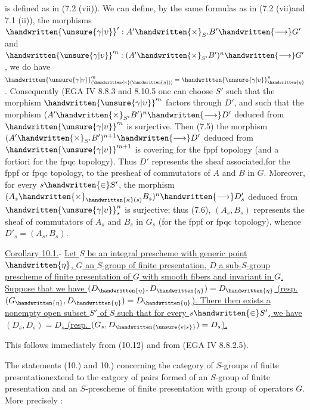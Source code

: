 is defined as in (7.2 (vii)). We can define, by the same formulas as in (7.2 (vii)and 7.1 (ii)), the morphisms $\handwritten{\unsure{\gamma|\upsilon}}':A'\handwritten{\times}_{S'}B'\handwritten{\longrightarrow}G'$ and $\handwritten{\unsure{\gamma|\upsilon}}'^n:(A'\handwritten{\times}_{S'}B')^n\handwritten{\longrightarrow}G'$, we do have $\handwritten{\unsure{\gamma|\upsilon}}'^n_{(\handwritten{\kappa}(\handwritten{\eta}))}=\handwritten{\unsure{\gamma|\upsilon}}^n_{\handwritten{\eta}}$. Consequently (EGA IV 8.8.3 and 8.10.5\deleted{)}\handwritten{,} one can choose $S'$ such that the morphism $\handwritten{\unsure{\gamma|\upsilon}}'^n$ factors through $D'$, and such that the morphism $(A'\handwritten{\times}_{S'}B')^n\handwritten{\longrightarrow}D'$ deduced from $\handwritten{\unsure{\gamma|\upsilon}}'^n$ is surjective. Then (7.5) the morphism $(A'\handwritten{\times}_{S'}B')^{n+1}\handwritten{\longrightarrow}D'$ deduced from $\handwritten{\unsure{\gamma|\upsilon}}'^{n+1}$ is covering for the fppf topology (and a fortiori for the fpqc topology). Thus $D'$ represents the sheaf associated,for the fppf or fpqc topology, to the presheaf of commutators of $A$ and $B$ in $G$. Moreover, for every $s\handwritten{\in}S'$, the morphism $(A_s\handwritten{\times}_{\handwritten{\kappa}(s)}B_s)^n\handwritten{\longrightarrow}D'_s$ deduced from $\handwritten{\unsure{\gamma|\upsilon}}^n_s$ is surjective; thus (7.6), $(A_s,B_s)$ represents the sheaf of commutators of $A_s$ and $B_s$ in $G_s$ (for the fppf or fpqc topology), whence $D'_s=(A_s,B_s)$.

\uline{Corollary 10.1.}- \uline{Let $S$ be an integral prescheme with generic point $\handwritten{\eta}$, $G$ an $S$-group of finite presentation, $D$ a sub-$S$-group prescheme of finite presentation of $G$ with smooth fibers and invariant in $G$. Suppose that we have $(D_{\handwritten{\eta}},D_{\handwritten{\eta}})=D_{\handwritten{\eta}}$ (resp. $(G_{\handwritten{\eta}},D_{\handwritten{\eta}})=D_{\handwritten{\eta}}$). There then exists a nonempty open subset $S'$ of $S$ such that for every $s\handwritten{\in}S'$, we have $(D_s,D_s)=D_s$ (resp. $(G_s,D_{\handwritten{\unsure{e|s}}})=D_s$).}

This follows immediately from (10.12) and from (EGA IV 8.8.2.5).

The statements (10.) and \inserted{\handwritten{(}}10.) concerning the category of $S$-groups of finite presentation\handwritten{[}extend to the catgory of pairs formed of an $S$-group of finite presentation and an  $S$-prescheme of finite presentation with group of operators $G$. More precisely :

